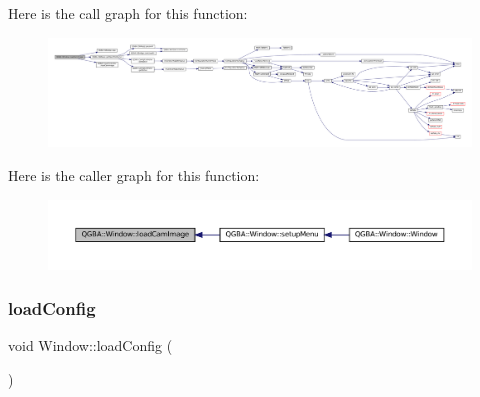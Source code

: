 Here is the call graph for this function\+:
\nopagebreak
\begin{figure}[H]
\begin{center}
\leavevmode
\includegraphics[width=350pt]{class_q_g_b_a_1_1_window_a44460af2464844d12066bd0ad2e6c955_cgraph}
\end{center}
\end{figure}
Here is the caller graph for this function\+:
\nopagebreak
\begin{figure}[H]
\begin{center}
\leavevmode
\includegraphics[width=350pt]{class_q_g_b_a_1_1_window_a44460af2464844d12066bd0ad2e6c955_icgraph}
\end{center}
\end{figure}
\mbox{\label{class_q_g_b_a_1_1_window_aef5de858c5948796e6e46699c1d2f45e}} 
\subsubsection{\texorpdfstring{load\+Config}{loadConfig}}
{\footnotesize\ttfamily void Window\+::load\+Config (\begin{DoxyParamCaption}{ }\end{DoxyParamCaption})\hspace{0.3cm}{\ttfamily [slot]}}

